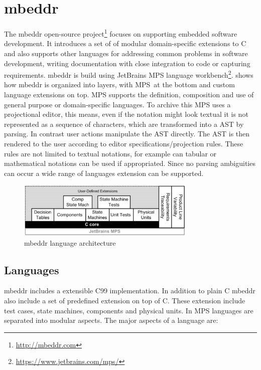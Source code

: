 \section{mbeddr}


The mbeddr open-source project\footnote{ \url{http://mbeddr.com}} 
focuses on supporting embedded software
development. It introduces a set of of modular domain-specific extensions
to C and also supports other languages for addressing common problems 
in software development, \eg writing documentation with close 
integration to code or capturing requirements. mbeddr is build using 
JetBrains \ac{MPS} language 
workbench\footnote{ \url{https://www.jetbrains.com/mps/}}.
 shows how mbeddr is organized into layers, with \ac{MPS} at
the bottom and custom language extensions on top.
\ac{MPS} supports the definition, 
composition and use of general purpose or domain-specific languages. 
To archive this \ac{MPS} uses a projectional editor, this means, even 
if the notation might look textual it is not represented as a sequence 
of characters, which are transformed into a \ac{AST} by parsing. 
In contrast user actions manipulate the \ac{AST} directly. The \ac{AST} 
is then rendered to the user according to editor specifications/projection
rules. These rules are not limited to textual notations, for example can tabular
or mathematical notations can be used if appropriated. Since no parsing ambiguities 
can occur a wide range of languages extension can be supported.

\begin{figure}[h]
  \vspace{-2mm}
  \centering
    \includegraphics[width=8.5cm]{./figures/mbeddArch.png} 
    \vspace{-2mm}
    \caption{mbeddr language architecture~\cite{Voelter:2012:MEC:2384716.2384767}}
  \label{mbeddrArch}
  \vspace{-2mm}
\end{figure}


\subsection{Languages}
\label{languageImplementation}
mbeddr includes a extensible C99 implementation. In addition to plain C 
mbeddr also include a set of predefined extension on top of C. These 
extension include test cases, state machines, components and physical units. 
In \ac{MPS} languages are separated into modular aspects. The major aspects 
of a language are:  

